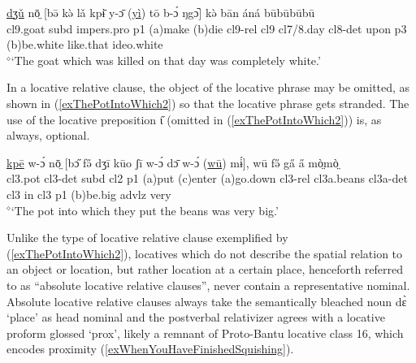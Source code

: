 \documentclass[10pt,twoside]{article}
\def\ci#1{{\ipaFont #1}}
\newcommand{\gl}[1]{`#1'}
\def\VSP{\vspace{0pt}}
\newcommand{\cl}[1]{{\sc cl#1}}
\newcommand{\pref}[1]{(\ref{#1})}
\def\elicited{$^\diamond$}
\def\ih{ɩ}
\newcommand{\comment}[1]{\textcolor{blue}{\emph{#1}}}
\begin{document}
\begin{exe} 
	\ex \label{exGoatTheyKilled2ResPro}	

		\gll	\uline{dʒǔ} nō̤ [bə̄ kə̀ lǎ kpɨ̄ y-ɔ̄ (\uline{yì}) tō b-ɔ́ ŋgɔ᷆] kə̀ bān áná būbūbūbū			\\
			\cl9.goat {\sc subd} {\sc impers.pro} {\sc p1} ({\sc a})make ({\sc b})die \cl9-{\sc rel} \cl9  \cl7/8.day \cl8-{\sc det} upon {\sc p3} ({\sc b})be.white like.that {\sc ideo}.white		\\
		\glt \VSP \elicited \gl{The goat which was killed on that day was completely white.}
\end{exe}%

In a locative relative clause, the object of the locative phrase may be omitted, as 
shown in \pref{exThePotIntoWhich2} so that the locative phrase 
gets stranded. The use of the locative preposition \ci{\H\ih} (omitted in \pref{exThePotIntoWhich2}) is, as always, optional.

\begin{exe}
	\ex \label{exThePotIntoWhich2}	
		\gll \uline{kpē} w-ɔ́ nō̤ [bɔ̋ fə̋ dʒī kūo ʃī w-ɔ́ dɔ̄ w-ɔ́ (\uline{wū}) mɨ́], wū fə̋ ga̋ a̋ mò̤mò̤	\\
		\cl3.pot \cl3-{\sc det} {\sc subd} \cl2  {\sc p1} ({\sc a})put ({\sc c})enter ({\sc a})go.down \cl3-{\sc rel} \cl3a.beans \cl3a-{\sc det} \cl3  in \cl3  {\sc p1} ({\sc b})be.big {\sc advlz} very 	\\
		\glt \VSP \elicited \gl{The pot into which they put the beans was very big.}
\end{exe}%

Unlike the type of locative relative clause exemplified by \pref{exThePotIntoWhich2}, locatives which do not describe the spatial relation to an object or location, but rather location at a certain place, henceforth referred to as ``absolute locative 
relative clauses'', never contain a representative nominal. Absolute locative 
relative clauses always take the semantically bleached noun \ci{dɛ̀} \gl{place} as head nominal and the 
postverbal relativizer agrees with a locative proform glossed \gl{{\sc prox}}, likely
a remnant of Proto-Bantu locative class 16, which 
encodes proximity \pref{exWhenYouHaveFinishedSquishing}. 
\end{document}
